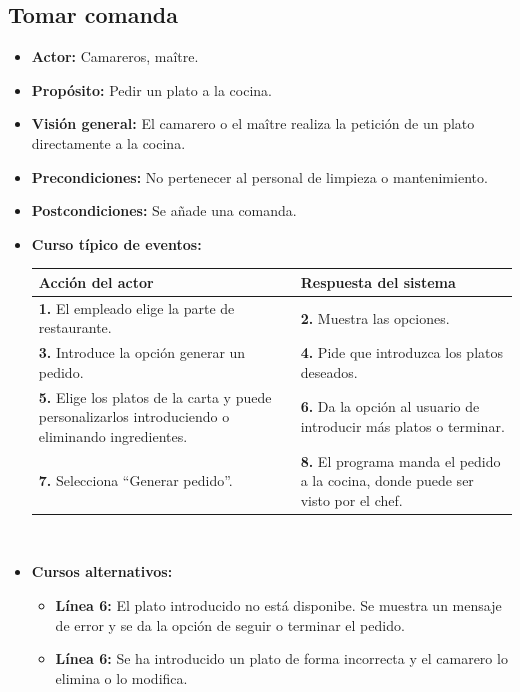 \documentclass[spanish,a4paper,11pt, twoside]{report}	%
\begin{document}

		\subsection{Tomar comanda}
			\begin{itemize}
			\item \textbf{Actor:} Camareros, maître.
			\item \textbf{Propósito: } Pedir un plato a la cocina.
			\item \textbf{Visión general:} El camarero o el maître realiza la petición de un
				plato directamente a la cocina.
			\item \textbf{Precondiciones:} No pertenecer al personal de limpieza o
				mantenimiento.
			\item \textbf{Postcondiciones:} Se añade una comanda.
			\item \textbf{Curso típico de eventos:} 	\\
				\begin{tabular}{|p{6cm}||p{6cm}|}
				\hline
				\textbf{Acción del actor} & \textbf{Respuesta del sistema} \\ \hline \hline
				\textbf{1.} El empleado elige la parte de restaurante. & 
				\textbf{2.} Muestra las opciones.\\ \hline 
				\textbf{3.} Introduce la opción generar un pedido. & 
				\textbf{4.} Pide que introduzca los platos deseados. \\ \hline
				\textbf{5.} Elige los platos de la carta y puede personalizarlos introduciendo
						o eliminando ingredientes. & 
				\textbf{6.} Da la opción al usuario de introducir más platos o terminar. \\ \hline 
				\textbf{7.} Selecciona ``Generar pedido''.	& 
				\textbf{8.} El programa manda el pedido a la cocina, donde puede ser visto por el chef. \\ \hline 
			\end{tabular}
			\\
			\item \textbf{Cursos alternativos:} 
			\begin{itemize}
				\item  \textbf{Línea 6:} El plato introducido no está disponibe. Se muestra un mensaje
					de error y se da la opción de seguir o terminar el pedido.
				\item  \textbf{Línea 6:} Se ha introducido un plato de forma incorrecta y el
					camarero lo elimina o lo modifica.
			\end {itemize}
		\end {itemize}
		
\end{document}

